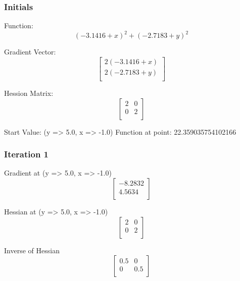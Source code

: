 \documentclass{article}
\begin{document}
\subsubsection{Initials}
Function:
\begin{equation}
\left( -3.1416 + x \right)^{2} + \left( -2.7183 + y \right)^{2}
\end{equation}

Gradient Vector:
\begin{equation}
\left[
\begin{array}{c}
2 \left( -3.1416 + x \right) \\
2 \left( -2.7183 + y \right) \\
\end{array}
\right]
\end{equation}

Hession Matrix:
\begin{equation}
\left[
\begin{array}{cc}
2 & 0 \\
0 & 2 \\
\end{array}
\right]
\end{equation}

Start Value:
(y => 5.0, x => -1.0)
Function at point:
22.359035754102166
\subsubsection{Iteration 1}
Gradient at (y => 5.0, x => -1.0)
\begin{equation}
\left[
\begin{array}{c}
-8.2832 \\
4.5634 \\
\end{array}
\right]
\end{equation}

Hessian at (y => 5.0, x => -1.0)
\begin{equation}
\left[
\begin{array}{cc}
2 & 0 \\
0 & 2 \\
\end{array}
\right]
\end{equation}

Inverse of Hessian
\begin{equation}
\left[
\begin{array}{cc}
0.5 & 0 \\
0 & 0.5 \\
\end{array}
\right]
\end{equation}
\end{document}
